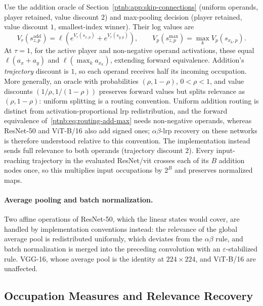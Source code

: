 Use the addition oracle of Section~\ref{ptnb:app:skip-connections} (uniform operands, player retained, value discount $2$) and max-pooling decision (player retained, value discount $1$, smallest-index winner). Their log values are
\begin{equation}\label{ptnb:eq:routing-add-max}
 V_r(s^{\mathrm{add}}_{z,p})=\ell(e^{V_r(s_{x,p})}+e^{V_r(s_{y,p})}),
 \qquad V_p(s^{\max}_{z,p})=\max_kV_p(s_{x_k,p}).
\end{equation}
At $\tau=1$, for the active player and non-negative operand activations, these equal $\ell(a_x+a_y)$ and $\ell(\max_k a_{x_k})$, extending forward equivalence. Addition's \emph{trajectory} discount is $1$, so each operand receives half its incoming occupation. More generally, an oracle with probabilities $(\rho,1-\rho)$, $0<\rho<1$, and value discounts $(1/\rho,1/(1-\rho))$ preserves forward values but splits relevance as $(\rho,1-\rho)$: uniform splitting is a routing convention. Uniform addition routing is distinct from activation-proportional \ac{lrp} redistribution, and the forward equivalence of~\eqref{ptnb:eq:routing-add-max} needs non-negative operands, whereas ResNet-50 and ViT-B/16 also add signed ones; $\alpha\beta$-\ac{lrp} recovery on these networks is therefore understood relative to this convention. The implementation instead sends full relevance to both operands (trajectory discount $2$). Every input-reaching trajectory in the evaluated ResNet/\ac{vit} crosses each of its $B$ addition nodes once, so this multiplies input occupations by $2^B$ and preserves normalized maps.

\paragraph{Average pooling and batch normalization.}
Two affine operations of ResNet-50, which the linear states would cover, are handled by implementation conventions instead: the relevance of the global average pool is redistributed uniformly, which deviates from the $\alpha\beta$ rule, and batch normalization is merged into the preceding convolution with an $\varepsilon$-stabilized rule. VGG-16, whose average pool is the identity at $224\times224$, and ViT-B/16 are unaffected.

\subsection{Occupation Measures and Relevance Recovery}\label{ptnb:app:routing-attribution}

